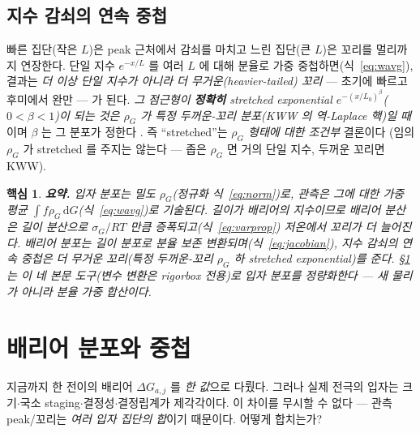\documentclass[11pt,a4paper]{article}
\newtheorem*{keybox}{핵심}
\newcommand{\dd}{\mathrm{d}}
\begin{document}
\subsection{지수 감쇠의 연속 중첩}
빠른 집단(작은 $L$)은 peak 근처에서 감쇠를 마치고 느린 집단(큰 $L$)은 꼬리를 멀리까지 연장한다. 단일 지수 $e^{-x/L}$ 를 여러 $L$
에 대해 분율로 가중 중첩하면(식~\eqref{eq:wavg}), 결과는 \emph{더 이상 단일 지수가 아니라 더 무거운(heavier-tailed)
꼬리} — 초기에 빠르고 후미에서 완만 — 가 된다. \emph{그 점근형이 \textbf{정확히} stretched exponential
$e^{-(x/L_0)^\beta}$($0<\beta<1$)이 되는 것은 $\rho_G$ 가 특정 두꺼운-꼬리 분포(KWW 의 역-Laplace 핵)일 때}이며 $\beta$ 는
그 분포가 정한다 \cite{lindsey1980,johnston2006,svare2000}. 즉 ``stretched''는 \emph{$\rho_G$ 형태에 대한 조건부} 결론이다
(임의 $\rho_G$ 가 stretched 를 주지는 않는다 — 좁은 $\rho_G$ 면 거의 단일 지수, 두꺼운 꼬리면 KWW).

\begin{keybox}
\textbf{요약.} 입자 분포는 밀도 $\rho_G$(정규화 식~\eqref{eq:norm})로, 관측은 그에 대한 가중 평균
$\int f\rho_G\,\dd G$(식~\eqref{eq:wavg})로 기술된다. 길이가 배리어의 지수이므로 배리어 분산은 길이 분산으로
$\sigma_G/RT$ 만큼 증폭되고(식~\eqref{eq:varprop}) 저온에서 꼬리가 더 늘어진다. 배리어 분포는 길이 분포로 분율
보존 변환되며(식~\eqref{eq:jacobian}), 지수 감쇠의 연속 중첩은 더 무거운 꼬리(특정 두꺼운-꼬리 $\rho_G$ 하 stretched
exponential)를 준다. \S\ref{sec:dist} 는 이 \emph{네 본문 도구}(변수 변환은 rigorbox 전용)로 입자 분포를 정량화한다 — 새 물리가 아니라 분율 가중 합산이다.
\end{keybox}

\section{배리어 분포와 중첩}\label{sec:dist}
지금까지 한 전이의 배리어 $\Delta G_{a,j}$ 를 \emph{한 값}으로 다뤘다. 그러나 실제 전극의 입자는
크기$\cdot$국소 staging$\cdot$결정성$\cdot$결정립계가 제각각이다. 이 차이를 무시할 수 없다 — 관측 peak/꼬리는
\emph{여러 입자 집단의 합}이기 때문이다. 어떻게 합치는가?
\end{document}

